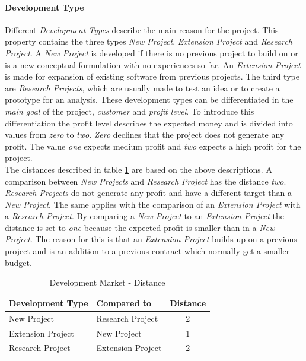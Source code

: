 \paragraph*{\textbf{Development Type}}
Different \textit{Development Types} describe the main reason for the project. This property contains the three types \textit{New Project}, \textit{Extension Project} and \textit{Research Project}. A \textit{New Project} is developed if there is no previous project to build on or is a new conceptual formulation with no experiences so far. An \textit{Extension Project} is made for expansion of existing software from previous projects. The third type are \textit{Research Projects}, which are usually made to test an idea or to create a prototype for an analysis. These development types can be differentiated in the \textit{main goal} of the project, \textit{customer} and \textit{profit level}. To introduce this differentiation the profit level describes the expected money and is divided into values from \textit{zero} to \textit{two}. \textit{Zero} declines that the project does not generate any profit. The value \textit{one} expects medium profit and \textit{two} expects a high profit for the project.\\
The distances described in table \ref{property:devtype} are based on the above descriptions. A comparison between \textit{New Projects} and \textit{Research Project} has the distance \textit{two}. \textit{Research Projects} do not generate any profit and have a different target than a \textit{New Project}. The same applies with the comparison of an \textit{Extension Project} with a \textit{Research Project}. By comparing a \textit{New Project} to an \textit{Extension Project} the distance is set to \textit{one} because the expected profit is smaller than in a \textit{New Project}. The reason for this is that an \textit{Extension Project} builds up on a previous project and is an addition to a previous contract which normally get a smaller budget.\\
\begin{table}[h]
	\centering 
	\setlength{\tabcolsep}{4pt}
	\begin{tabular}{|l|l|c|}\hline
		Development Type		& Compared to 			&  Distance 	\\ \hline
		New Project   			& Research Project		& 2      		\\ \hline
		Extension Project   	& New Project 			& 1      		\\ \hline
		Research Project   		& Extension Project 	& 2     		\\ \hline
	\end{tabular} 
	\caption{Development Market - Distance} 
	\label{property:devtype} 
\end{table}
